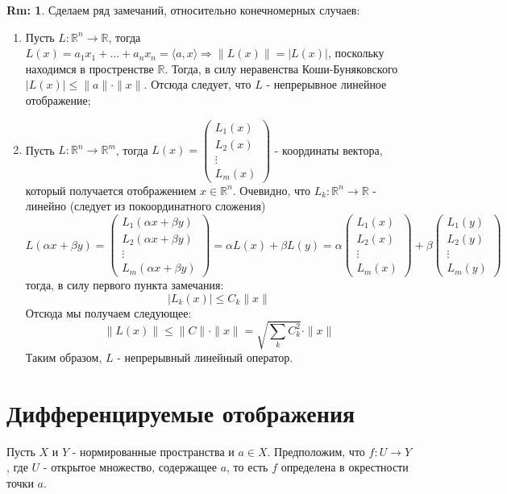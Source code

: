 \documentclass[12pt]{article}
\newcommand{\MR}{\mathbb{R}}
\theoremstyle{definition}
\newtheorem{rem}{Rm:}
\begin{document}
\begin{rem}
	Сделаем ряд замечаний, относительно конечномерных случаев:
	\begin{enumerate}[label ={\arabic*)}]
		\item 	Пусть $L \colon \MR^n \to \MR$, тогда $L(x) = a_1 x_1 + \dotsc + a_n x_n = \langle a,x \rangle \Rightarrow \|L(x) \| = |L(x)|$, поскольку находимся в простренстве $\MR$. Тогда, в силу неравенства Коши-Буняковского $|L(x)| \leq \|a\|{\cdot}\|x\|$. Отсюда следует, что $L$ - непрерывное линейное отображение;
		\item Пусть $L \colon \MR^n \to \MR^m$, тогда 
		$
			L(x) = 
			\begin{pmatrix}
				L_1(x)\\
				L_2(x)\\
				\vdots\\
				L_m(x)
			\end{pmatrix}
		$ - координаты вектора, который получается отображением $x \in \MR^n$. Очевидно, что $L_k \colon \MR^n \to \MR$ - линейно (следует из покоординатного сложения) 
		$$
			L(\alpha x + \beta y) = 
			\begin{pmatrix}
				L_1(\alpha x + \beta y)\\
				L_2(\alpha x + \beta y)\\
				\vdots\\
				L_m(\alpha x + \beta y)
			\end{pmatrix}
			= \alpha L(x) + \beta L(y) = \alpha
						\begin{pmatrix}
				L_1(x)\\
				L_2(x)\\
				\vdots\\
				L_m(x)
			\end{pmatrix} + \beta 
			\begin{pmatrix}
				L_1(y)\\
				L_2(y)\\
				\vdots\\
				L_m(y)
			\end{pmatrix}
		$$
		тогда, в силу первого пункта замечания: 
		$$
			|L_k(x)| \leq C_k\|x\|
		$$ 
		Отсюда мы получаем следующее: 
		$$
			\|L(x)\| \leq \|C\|{\cdot}\|x\| = \sqrt{\displaystyle\sum\limits_{k}C_k^2}{\cdot} \|x\|
		$$
		Таким образом, $L$ - непрерывный линейный оператор. 
	\end{enumerate}
\end{rem}

\newpage
\section*{Дифференцируемые отображения}
Пусть $X$ и $Y$ - нормированные пространства и $a \in X$. Предположим, что $f \colon U \to Y$, где $U$ - открытое множество, содержащее $a$, то есть $f$ определена в окрестности точки $a$.
\end{document}
